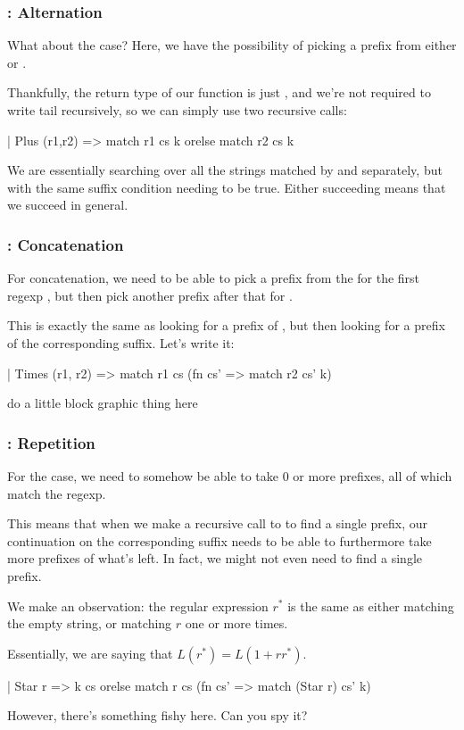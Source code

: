 \documentclass[aspectratio=169]{beamer}
\begin{document}
\begin{frame}[fragile]
  \frametitle{: Alternation}

  What about the  case? Here, we have the possibility of
  picking a prefix from either  or .

  Thankfully, the return type of our function  is just ,
  and we're not required to write  tail recursively, so we can
  simply use two recursive calls:

  \begin{codeblock}
    | Plus (r1,r2) => match r1 cs k orelse match r2 cs k
  \end{codeblock}

  We are essentially searching over all the strings matched by  and
   separately, but with the same suffix condition needing to be true.
  Either succeeding means that we succeed in general.
\end{frame}

\begin{frame}[fragile]
  \frametitle{: Concatenation}

  For concatenation, we need to be able to pick a prefix from the 
  for the first regexp , but then pick another prefix after that for
  .

  This is exactly the same as looking for a prefix of , but then
  looking for a prefix of the corresponding suffix. Let's write it:

  \begin{codeblock}
    | Times (r1, r2) => match r1 cs (fn cs' => match r2 cs' k)
  \end{codeblock}

  do a little block graphic thing here
\end{frame}

\begin{frame}[fragile]
  \frametitle{: Repetition}

  For the  case, we need to somehow be able to take 0 or more 
  prefixes, all of which match the  regexp.

  This means that when we make a recursive call to  to find a single
  prefix, our continuation on the corresponding suffix needs to be able to
  furthermore take more prefixes of what's left. In fact, we might not even
  need to find a single prefix.

  We make an observation: the regular expression $r^*$ is the same as either
  matching the empty string, or matching $r$ one or more times.
  
  Essentially, we are saying that $L(r^*) = L(1 + rr^*)$.
  
  \begin{codeblock}
    | Star r => 
        k cs orelse match r cs (fn cs' => match (Star r) cs' k)
  \end{codeblock}

  However, there's something fishy here. Can you spy it?
\end{frame}
\end{document}
